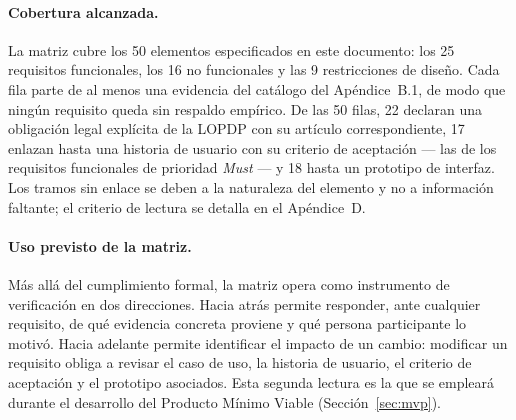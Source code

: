 \documentclass[journal,onecolumn]{IEEEtran}
\begin{document}
	\paragraph{Cobertura alcanzada.}
	La matriz cubre los 50 elementos especificados en este documento: los 25
	requisitos funcionales, los 16 no funcionales y las 9 restricciones de
	diseño. Cada fila parte de al menos una evidencia del catálogo del
	Apéndice~B.1, de modo que ningún requisito queda sin respaldo empírico. De
	las 50 filas, 22 declaran una obligación legal explícita de la LOPDP con su
	artículo correspondiente, 17 enlazan hasta una historia de usuario con su
	criterio de aceptación --- las de los requisitos funcionales de prioridad
	\emph{Must} --- y 18 hasta un prototipo de interfaz. Los tramos sin enlace se
	deben a la naturaleza del elemento y no a información faltante; el criterio
	de lectura se detalla en el Apéndice~D.
	
	\paragraph{Uso previsto de la matriz.}
	Más allá del cumplimiento formal, la matriz opera como instrumento de
	verificación en dos direcciones. Hacia atrás permite responder, ante
	cualquier requisito, de qué evidencia concreta proviene y qué persona
	participante lo motivó. Hacia adelante permite identificar el impacto de un
	cambio: modificar un requisito obliga a revisar el caso de uso, la historia
	de usuario, el criterio de aceptación y el prototipo asociados. Esta segunda
	lectura es la que se empleará durante el desarrollo del Producto Mínimo
	Viable (Sección~\ref{sec:mvp}).
	
\end{document}
